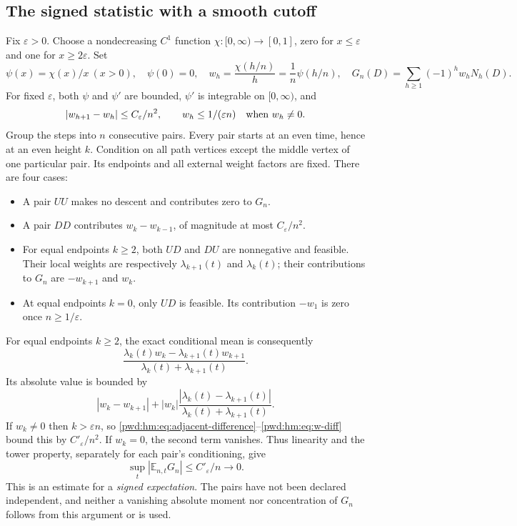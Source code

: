 \documentclass[11pt,letterpaper]{article}
\numberwithin{equation}{section}
\theoremstyle{remark}\newtheorem{remark}[theorem]{Remark}
\newcommand{\E}{\mathbb E}\newcommand{\Prob}{\mathbb P}
\begin{document}
\subsection{The signed statistic with a smooth cutoff}
Fix $\varepsilon>0$. Choose a nondecreasing $C^1$ function $\chi:[0,\infty)\to[0,1]$, zero for $x\le\varepsilon$ and one for $x\ge2\varepsilon$. Set
\[
 \psi(x)=\chi(x)/x\ (x>0),\quad\psi(0)=0,\quad
 w_h=\frac{\chi(h/n)}h=\frac1n\psi(h/n),\quad
 G_n(D)=\sum_{h\ge1}(-1)^hw_hN_h(D).
\]
For fixed $\varepsilon$, both $\psi$ and $\psi'$ are bounded, $\psi'$ is integrable on $[0,\infty)$, and
\begin{equation}\label{pwd:hm:eq:w-diff}
 |w_{h+1}-w_h|\le C_\varepsilon/n^2,\qquad
 w_h\le1/(\varepsilon n)\quad\hbox{when }w_h\ne0.
\end{equation}
Group the steps into $n$ consecutive pairs. Every pair starts at an even time, hence at an even height $k$. Condition on all path vertices except the middle vertex of one particular pair. Its endpoints and all external weight factors are fixed. There are four cases:
\begin{itemize}[leftmargin=1.6em]
 \item A pair $UU$ makes no descent and contributes zero to $G_n$.
 \item A pair $DD$ contributes $w_k-w_{k-1}$, of magnitude at most $C_\varepsilon/n^2$.
 \item For equal endpoints $k\ge2$, both $UD$ and $DU$ are nonnegative and feasible. Their local weights are respectively $\lambda_{k+1}(t)$ and $\lambda_k(t)$; their contributions to $G_n$ are $-w_{k+1}$ and $w_k$.
 \item At equal endpoints $k=0$, only $UD$ is feasible. Its contribution $-w_1$ is zero once $n\ge1/\varepsilon$.
\end{itemize}
For equal endpoints $k\ge2$, the exact conditional mean is consequently
\begin{equation}\label{pwd:hm:eq:conditional-pair}
 \frac{\lambda_k(t)w_k-\lambda_{k+1}(t)w_{k+1}}
 {\lambda_k(t)+\lambda_{k+1}(t)}.
\end{equation}
Its absolute value is bounded by
\[
 |w_k-w_{k+1}|+|w_k|\frac{|\lambda_k(t)-\lambda_{k+1}(t)|}{\lambda_k(t)+\lambda_{k+1}(t)}.
\]
If $w_k\ne0$ then $k>\varepsilon n$, so \eqref{pwd:hm:eq:adjacent-difference}--\eqref{pwd:hm:eq:w-diff} bound this by $C'_\varepsilon/n^2$. If $w_k=0$, the second term vanishes. Thus linearity and the tower property, separately for each pair's conditioning, give
\begin{equation}\label{pwd:hm:eq:cutoff-signed}
 \sup_t|\E_{n,t}G_n|\le C'_\varepsilon/n\longrightarrow0.
\end{equation}
This is an estimate for a \emph{signed expectation}. The pairs have not been declared independent, and neither a vanishing absolute moment nor concentration of $G_n$ follows from this argument or is used.
\end{document}
